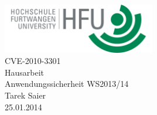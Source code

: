 \documentclass[pdftex,fontsize=11pt,a4paper]{scrbook}
\begin{document}
\begin{titlepage}
\thispagestyle{empty}
\begin{center}
\includegraphics[width=0.5\textwidth]{hfu.png}~\\[1.5cm]
\Huge CVE-2010-3301\\[0.6cm]
\LARGE Hausarbeit\\
\Huge Anwendungssicherheit WS2013/14\\[1cm]
\LARGE Tarek Saier\\[0.2cm]
\normalsize 25.01.2014
\end{center}
\end{titlepage}
\end{document}
